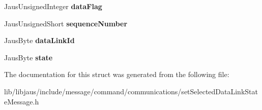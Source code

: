\begin{DoxyCompactItemize}
\item 
\hypertarget{struct_set_selected_data_link_state_message_struct_af90e1e88fdaba73433a91ad380e030a1}{\-Jaus\-Unsigned\-Integer {\bfseries data\-Flag}}\label{struct_set_selected_data_link_state_message_struct_af90e1e88fdaba73433a91ad380e030a1}

\item 
\hypertarget{struct_set_selected_data_link_state_message_struct_a77c105591bf29e5e34c401d5def858a8}{\-Jaus\-Unsigned\-Short {\bfseries sequence\-Number}}\label{struct_set_selected_data_link_state_message_struct_a77c105591bf29e5e34c401d5def858a8}

\item 
\hypertarget{struct_set_selected_data_link_state_message_struct_a40bdab883169d9cd8a9fac462294c9dc}{\-Jaus\-Byte {\bfseries data\-Link\-Id}}\label{struct_set_selected_data_link_state_message_struct_a40bdab883169d9cd8a9fac462294c9dc}

\item 
\hypertarget{struct_set_selected_data_link_state_message_struct_a948f3e2d5ae947b218d47812e1fc6435}{\-Jaus\-Byte {\bfseries state}}\label{struct_set_selected_data_link_state_message_struct_a948f3e2d5ae947b218d47812e1fc6435}

\end{DoxyCompactItemize}


\-The documentation for this struct was generated from the following file\-:\begin{DoxyCompactItemize}
\item 
lib/libjaus/include/message/command/communications/set\-Selected\-Data\-Link\-State\-Message.\-h\end{DoxyCompactItemize}
